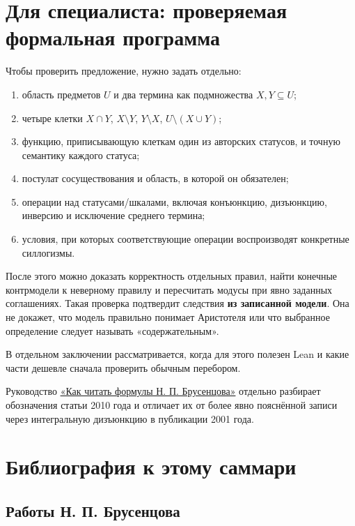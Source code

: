 \documentclass[12pt,a4paper]{article}
\begin{document}
\section{Для специалиста: проверяемая формальная программа}

Чтобы проверить предложение, нужно задать отдельно:

\begin{enumerate}
\item область предметов \(U\) и два термина как подмножества \(X,Y\subseteq U\);
\item четыре клетки \(X\cap Y\), \(X\setminus Y\), \(Y\setminus X\), \(U\setminus(X\cup Y)\);
\item функцию, приписывающую клеткам один из авторских статусов, и точную семантику каждого статуса;
\item постулат сосуществования и область, в которой он обязателен;
\item операции над статусами/шкалами, включая конъюнкцию, дизъюнкцию, инверсию и исключение среднего термина;
\item условия, при которых соответствующие операции воспроизводят конкретные силлогизмы.
\end{enumerate}
После этого можно доказать корректность отдельных правил, найти конечные контрмодели к неверному правилу и пересчитать модусы при явно заданных соглашениях. Такая проверка подтвердит следствия \textbf{из записанной модели}. Она не докажет, что модель правильно понимает Аристотеля или что выбранное определение следует называть «содержательным».

В отдельном заключении рассматривается, когда для этого полезен Lean и какие части дешевле сначала проверить обычным перебором.

Руководство \href{Как-читать-формулы-Брусенцова.tex}{«Как читать формулы Н. П. Брусенцова»} отдельно разбирает обозначения статьи 2010 года и отличает их от более явно пояснённой записи через интегральную дизъюнкцию в публикации 2001 года.

\section{Библиография к этому саммари}

\subsection{Работы Н. П. Брусенцова}
\end{document}

